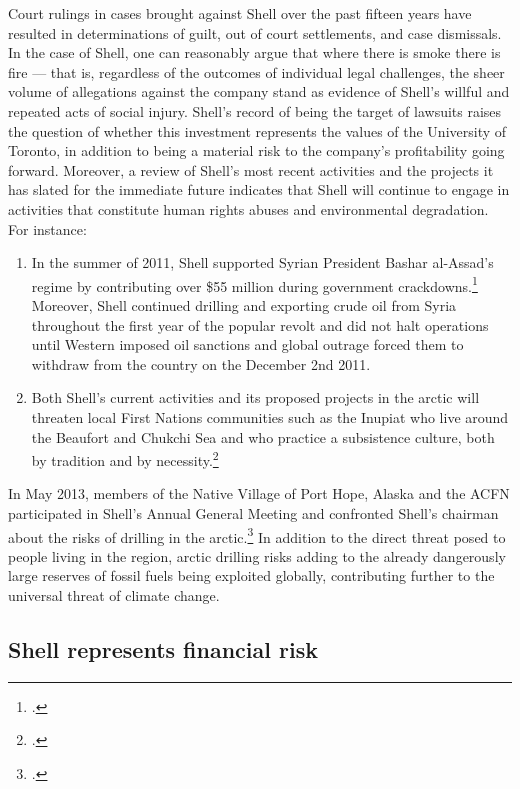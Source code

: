 	
Court rulings in cases brought against Shell over the past fifteen years have resulted in determinations of guilt, out of court settlements, and case dismissals. 
In the case of Shell, one can reasonably argue that where there is smoke there is fire --- that is, regardless of the outcomes of individual legal challenges, the sheer volume of allegations against the company stand as evidence of Shell's willful and repeated acts of social injury.
Shell's record of being the target of lawsuits raises the question of whether this investment represents the values of the University of Toronto, in addition to being a material risk to the company's profitability going forward.
Moreover, a review of Shell's most recent activities and the projects it has slated for the immediate future indicates that Shell will continue to engage in activities that constitute human rights abuses and environmental degradation.
For instance:
\begin{enumerate}
	\item In the summer of 2011, Shell supported Syrian President Bashar al-Assad's regime by contributing over \$55 million during government crackdowns.\footcite[][]{Syria_2011} Moreover, Shell continued drilling and exporting crude oil from Syria throughout the first year of the popular revolt and did not halt operations until Western imposed oil sanctions and global outrage forced them to withdraw from the country on the December 2nd 2011.
	\item Both Shell's current activities and its proposed projects in the arctic will threaten local First Nations communities such as the Inupiat who live around the Beaufort and Chukchi Sea and who practice a subsistence culture, both by tradition and by necessity.\footcite[][p. 13]{RiskingRuin_2012}
\end{enumerate}
In May 2013, members of the Native Village of Port Hope, Alaska and the ACFN participated in Shell's Annual General Meeting and confronted Shell's chairman about the risks of drilling in the arctic.\footcite{ShellArcticOilRush}
In addition to the direct threat posed to people living in the region, arctic drilling risks adding to the already dangerously large reserves of fossil fuels being exploited globally, contributing further to the universal threat of climate change.



	\subsection{Shell represents financial risk}
	


